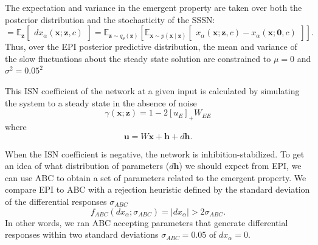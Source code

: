 \documentclass[11pt]{article}
\begin{document}
The expectation and variance in the emergent property are taken over both the posterior distribution and the stochasticity of the SSSN:
\begin{equation}
= \mathbb{E}_{\mathbf{z}}\begin{bmatrix} dx_\alpha(\mathbf{x}; \mathbf{z},c) \end{bmatrix}  = \mathbb{E}_{\mathbf{z}\sim q_\theta(\mathbf{z})} \left[ \mathbb{E}_{\mathbf{x} \sim p(\mathbf{x} \mid \mathbf{z})} \begin{bmatrix} x_\alpha(\mathbf{x}; \mathbf{z},c) - x_\alpha(\mathbf{x}; \mathbf{0},c) \end{bmatrix}\right].
\end{equation}
Thus, over the EPI posterior predictive distribution, the mean and variance of the slow fluctuations about the steady state solution are constrained to $\mu = 0$ and $\sigma^2 = 0.05^2$

This ISN coefficient of the network at a given input is calculated by simulating the system to a steady state in the absence of noise
\begin{equation}
    \gamma(\mathbf{x}; \mathbf{z}) = 1 - 2 \left[u_E \right]_+ W_{EE}
\end{equation}
where
\begin{equation}
    \mathbf{u} = W\mathbf{x} + \mathbf{h} + d\mathbf{h}.
\end{equation}

When the ISN coefficient is negative, the network is inhibition-stabilized.  
To get an idea of what distribution of parameters ($d\mathbf{h}$) we should expect from EPI, we can use ABC to obtain a set of parameters related to the emergent property.  
We compare EPI to ABC with a rejection heuristic defined by the standard deviation of the differential responses $\sigma_{ABC}$
 \begin{equation}
 f_{ABC}(dx_\alpha; \sigma_{ABC}) = |dx_\alpha| > 2\sigma_{ABC}.
 \end{equation}
 In other words, we ran ABC accepting parameters that generate differential responses within two standard deviations $\sigma_{ABC}=0.05$ of $dx_\alpha = 0$.
\end{document}
